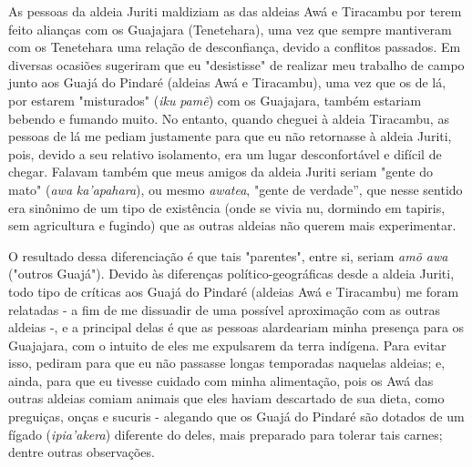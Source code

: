 As pessoas da aldeia Juriti maldiziam as das aldeias Awá e Tiracambu por
terem feito alianças com os Guajajara (Tenetehara), uma vez que sempre
mantiveram com os Tenetehara uma relação de desconfiança, devido a
conflitos passados. Em diversas ocasiões sugeriram que eu "desistisse"
de realizar meu trabalho de campo junto aos Guajá do Pindaré (aldeias
Awá e Tiracambu), uma vez que os de lá, por estarem "misturados"
(\emph{iku} \emph{pamẽ}) com os Guajajara, também estariam bebendo e
fumando muito. No entanto, quando cheguei à aldeia Tiracambu, as pessoas
de lá me pediam justamente para que eu não retornasse à aldeia Juriti,
pois, devido a seu relativo isolamento, era um lugar desconfortável e
difícil de chegar. Falavam também que meus amigos da aldeia Juriti
seriam "gente do mato" (\emph{awa} \emph{ka'apahara}), ou mesmo
\emph{awatea}, "gente de verdade'', que nesse sentido era sinônimo de um
tipo de existência (onde se vivia nu, dormindo em tapiris, sem
agricultura e fugindo) que as outras aldeias não querem mais
experimentar.

O resultado dessa diferenciação é que tais "parentes", entre si, seriam
\emph{amõ awa} ("outros Guajá"). Devido às diferenças
político-geográficas desde a aldeia Juriti, todo tipo de críticas aos
Guajá do Pindaré (aldeias Awá e Tiracambu) me foram relatadas - a fim de
me dissuadir de uma possível aproximação com as outras aldeias -, e a
principal delas é que as pessoas alardeariam minha presença para os
Guajajara, com o intuito de eles me expulsarem da terra indígena. Para
evitar isso, pediram para que eu não passasse longas temporadas naquelas
aldeias; e, ainda, para que eu tivesse cuidado com minha alimentação,
pois os Awá das outras aldeias comiam animais que eles haviam descartado
de sua dieta, como preguiças, onças e sucuris - alegando que os Guajá do
Pindaré são dotados de um fígado (\emph{ipia'akera}) diferente do deles,
mais preparado para tolerar tais carnes; dentre outras observações.

